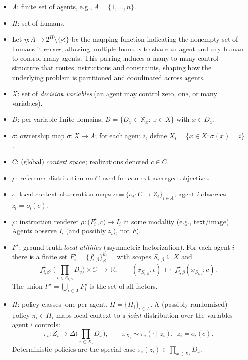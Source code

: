 \begin{itemize}
\item $A$: finite set of agents, e.g., $A=\{1,\dots,n\}$.
\item $H$: set of humans.
\item Let $\eta:A\to 2^{H}\setminus\{\varnothing\}$ be the mapping function indicating the nonempty set of humans it serves, allowing multiple humans to share an agent and any human to control many agents. This pairing induces a many-to-many control structure that routes instructions and constraints, shaping how the underlying problem is partitioned and coordinated across agents.

\item $X$: set of \emph{decision variables} (an agent may control zero, one, or many variables).
\item $D$: per-variable finite domains, $D=\{D_x\subset\mathbb{X}_x:\ x\in X\}$ with $x\in D_x$.
\item $\sigma$: ownership map $\sigma:X\to A$; for each agent $i$, define $X_i=\{x\in X:\sigma(x)=i\}$.
\item $C$: (global) \emph{context} space; realizations denoted $c\in C$.
\item $\mu$: reference distribution on $C$ used for context-averaged objectives.
\item $o$: local context observation maps $o=\{o_i:C\to Z_i\}_{i\in A}$; agent $i$ observes $z_i=o_i(c)$.
\item $\rho$: instruction renderer $\rho:\big(F_i^\star,c\big)\mapsto I_i$ in some modality (e.g., text/image). Agents observe $I_i$ (and possibly $z_i$), not $F_i^\star$.
\item $F^\star$: ground-truth \emph{local utilities} (asymmetric factorization).
      For each agent $i$ there is a finite set $F_i^\star=\{f_{i,\beta}^\star\}_{\beta=1}^{k_i}$ with scopes $S_{i,\beta}\subseteq X$ and
      \[
      f_{i,\beta}^\star:\Big(\prod_{v\in S_{i,\beta}} D_v\Big)\times C\ \to\ \mathbb{R},\qquad
      (x_{S_{i,\beta}},c)\ \mapsto\ f_{i,\beta}^\star(x_{S_{i,\beta}};c).
      \]
      The union $F^\star=\bigcup_{i\in A}F_i^\star$ is the set of all factors.
\item $\Pi$: policy classes, one per agent, $\Pi=\{\Pi_i\}_{i\in A}$.
      A (possibly randomized) policy $\pi_i\in\Pi_i$ maps local context to a \emph{joint} distribution over the variables agent $i$ controls:
      \[
      \pi_i: Z_i \to \Delta\!\Big(\prod_{x\in X_i} D_x\Big),\qquad
      x_{X_i} \sim \pi_i(\cdot\mid z_i),\ \ z_i=o_i(c).
      \]
      Deterministic policies are the special case $\pi_i(z_i)\in \prod_{x\in X_i} D_x$.
\end{itemize}


